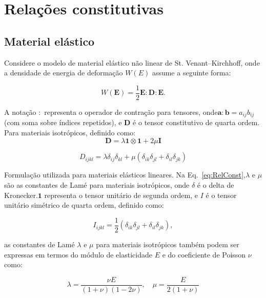\chapter{Relações constitutivas}\label{ch:Constitutiva}
\section{Material elástico}
Considere o modelo de material elástico não linear de St. Venant–Kirchhoff, onde a densidade de energia de deformação $W(E)$ assume a seguinte forma:

\begin{equation}\label{eq:DensidadeEnergia}
	W(\mathbf{E}) = \frac{1}{2} \mathbf{E} : \mathbf{D} : \mathbf{E}.
\end{equation}

A notação $:$ representa o operador de contração para tensores, onde$\mathbf{a}:\mathbf{b} = a_{ij} b_{ij}$ (com soma sobre índices repetidos), e $\mathbf{D}$ é o tensor constitutivo de quarta ordem. Para materiais isotrópicos, definido como:
\begin{equation}
	\mathbf{D} =\lambda \mathbf{1} \otimes \mathbf{1} + 2 \mu \mathbf{I}
\end{equation}

\begin{equation}\label{eq:RelConst}
	D_{ijkl} = \lambda \delta_{ij} \delta_{kl} + \mu (\delta_{ik} \delta_{jl} + \delta_{il} \delta_{jk})
\end{equation}

Formulação utilizada para materiais elásticos lineares. Na Eq.~\eqref{eq:RelConst},$\lambda$ e $\mu$ são as constantes de Lamé para materiais isotrópicos, onde $\delta$ é o delta de Kronecker.$\mathbf{1}$ representa o tensor unitário de segunda ordem, e $I$ é o tensor unitário simétrico de quarta ordem, definido como:

\begin{equation}
	I_{ijkl} = \frac{1}{2} (\delta_{ik} \delta_{jl} + \delta_{il} \delta_{jk}),
\end{equation}

as constantes de Lamé $\lambda$ e $\mu$ para materiais isotrópicos também podem ser expressas em termos do módulo de elasticidade $E$ e do coeficiente de Poisson $\nu$ como:

\begin{equation}
	\lambda = \frac{\nu E}{(1 + \nu)(1 - 2\nu)}, \quad \mu = \frac{E}{2(1 + \nu)}
\end{equation}

